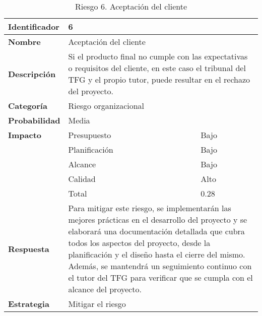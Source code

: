 \begin{table}[H]
    \centering
    \caption{Riesgo 6. Aceptación del cliente }
    \label{table:risk_aceptacion}
    \begin{tabular}{>{\columncolor{lightgreen!20}}l l l}
    \toprule
    \rowcolor{lightgreen}
    \textbf{Identificador} & \multicolumn{2}{l}{6} \\
    \midrule
    \textbf{Nombre} & \multicolumn{2}{l}{Aceptación del cliente} \\
    \midrule
    \textbf{Descripción} & \multicolumn{2}{p{10cm}}{Si el producto final no cumple con las expectativas o requisitos del cliente, en este caso el tribunal del TFG y el propio tutor, puede resultar en el rechazo del proyecto.} \\
    \midrule
    \textbf{Categoría} & \multicolumn{2}{l}{Riesgo organizacional} \\
    \midrule
    \textbf{Probabilidad} & \multicolumn{2}{l}{Media} \\
    \midrule
    \textbf{Impacto} & Presupuesto & Bajo \\
    \cmidrule(lr){2-3}
    & Planificación & Bajo \\
    \cmidrule(lr){2-3}
    & Alcance & Bajo \\
    \cmidrule(lr){2-3}
    & Calidad & Alto \\
    \cmidrule(lr){2-3}
    & Total & 0.28 \\
    \midrule
    \textbf{Respuesta} & \multicolumn{2}{p{10cm}}{Para mitigar este riesgo, se implementarán las mejores prácticas en el desarrollo del proyecto y se elaborará una documentación detallada que cubra todos los aspectos del proyecto, desde la planificación y el diseño hasta el cierre del mismo. Además, se mantendrá un seguimiento continuo con el tutor del TFG para verificar que se cumpla con el alcance del proyecto.} \\
    \midrule
    \textbf{Estrategia} & \multicolumn{2}{l}{Mitigar el riesgo} \\
    \bottomrule
    \end{tabular}
\end{table}


